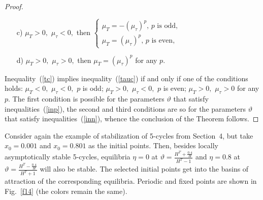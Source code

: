 \documentclass[12pt,a4paper]{amsart}
\begin{document}
\begin{proof}
\begin{enumerate}
\medskip
\item[c)] $\mu_T>0,$ $\mu_\tau<0,$ then 
$\left\{\begin{array}{ll}
\mu_T = -(\mu_\tau)^p,\, p \text{ is odd}, \\
\mu_T = (\mu_\tau)^p,\, p \text{ is even},
\end{array}\right.$

\medskip
\item[d)] $\mu_T>0,$ $\mu_\tau>0,$ then $\mu_T = (\mu_\tau)^p$ for any $p.$  
\end{enumerate}

Inequality~(\ref{tc}) implies inequality~(\ref{tauc}) if and only if one of the conditions holds: $\mu_T<0,$ $\mu_\tau<0,$ $p$ is odd; 
$\mu_T>0,$ $\mu_\tau<0,$ $p$ is even; $\mu_T>0,$ $\mu_\tau>0$ for any $p.$ The first condition is possible for the parameters $\vartheta$ that satisfy 
inequalities~(\ref{inp}), the second and third conditions are so for the parameters $\vartheta$ that satisfy inequalities~(\ref{inn}), whence the conclusion 
of the Theorem follows.
\end{proof}

Consider again the example of stabilization of 5-cycles from Section~4, but take $x_0=0.001$ and $x_0=0.801$ as the initial points. Then, besides locally 
asymptotically stable 5-cycles, equilibria $\eta=0$ at $\vartheta = \frac{H^T + \frac{0.4}{H}}{H^T - 1}$ and $\eta=0.8$ at 
$\vartheta = \frac{H^T - \frac{0.4}{H}}{H^T + 1}$ will also be stable. The selected initial points get into the basins of attraction of the corresponding 
equilibria. Periodic and fixed points are shown in Fig.~\ref{f14} (the colors remain the same).
\end{document}
